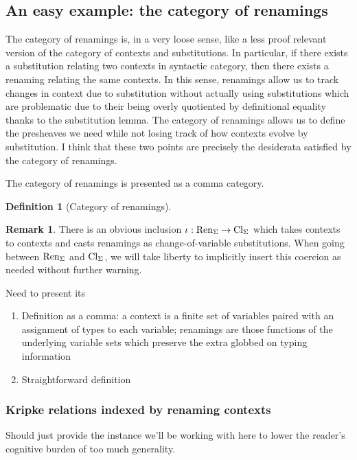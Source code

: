 \documentclass[12pt,twoside]{reedthesis}
\theoremstyle{definition}
\newtheorem{definition}{Definition}
\newtheorem{remark}{Remark}
\theoremstyle{remark}
\theoremstyle{plain}
\begin{document}
\subsection{An easy example: the category of renamings}
The category of renamings is, in a very loose sense, like a less proof relevant
version of the category of contexts and substitutions. In particular, if there
exists a substitution relating two contexts in syntactic category, then there
exists a renaming relating the same contexts. In this sense, renamings allow us
to track changes in context due to substitution without actually using
substitutions which are problematic due to their being overly quotiented by
definitional equality thanks to the substitution lemma. The category of
renamings allows us to define the presheaves we need while not losing track of
how contexts evolve by substitution. I think that these two points are precisely
the desiderata satisfied by the category of renamings.

The category of renamings is presented as a comma category.
\begin{definition}[Category of renamings]

\end{definition}

\begin{remark}\label{rem:reninclusioncl}
  There is an obvious inclusion \( \iota : \text{Ren}_\Sigma \rightarrow \text{Cl}_\Sigma \) which takes contexts to
  contexts and casts renamings as change-of-variable substitutions. When going
  between \( \text{Ren}_\Sigma \) and \( \text{Cl}_\Sigma \), we will take liberty to implicitly insert
  this coercion as needed without further warning.
\end{remark}

Need to present its
\begin{enumerate}
  \item Definition as a comma: a context is a finite set of variables paired
        with an assignment of types to each variable; renamings are those
        functions of the underlying variable sets which preserve the extra
        globbed on typing information
  \item Straightforward definition
\end{enumerate}

\subsubsection{Kripke relations indexed by renaming contexts}
Should just provide the instance we'll be working with here to lower the
reader's cognitive burden of too much generality.
\end{document}
